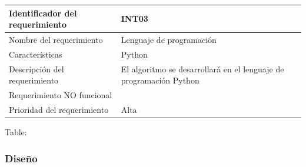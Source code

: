 \documentclass[]{article}
\begin{document}
\begin{longtable}[]{@{}ll@{}}
\toprule
\begin{minipage}[b]{0.39\columnwidth}\raggedright\strut
Identificador del requerimiento\strut
\end{minipage} & \begin{minipage}[b]{0.50\columnwidth}\raggedright\strut
INT03\strut
\end{minipage}\tabularnewline
\midrule
\endhead
\begin{minipage}[t]{0.39\columnwidth}\raggedright\strut
Nombre del requerimiento\strut
\end{minipage} & \begin{minipage}[t]{0.50\columnwidth}\raggedright\strut
Lenguaje de programación\strut
\end{minipage}\tabularnewline
\begin{minipage}[t]{0.39\columnwidth}\raggedright\strut
Características\strut
\end{minipage} & \begin{minipage}[t]{0.50\columnwidth}\raggedright\strut
Python\strut
\end{minipage}\tabularnewline
\begin{minipage}[t]{0.39\columnwidth}\raggedright\strut
Descripción del requerimiento\strut
\end{minipage} & \begin{minipage}[t]{0.50\columnwidth}\raggedright\strut
El algoritmo se desarrollará en el lenguaje de programación Python\strut
\end{minipage}\tabularnewline
\begin{minipage}[t]{0.39\columnwidth}\raggedright\strut
Requerimiento NO funcional\strut
\end{minipage} & \begin{minipage}[t]{0.50\columnwidth}\raggedright\strut
\strut
\end{minipage}\tabularnewline
\begin{minipage}[t]{0.39\columnwidth}\raggedright\strut
Prioridad del requerimiento\strut
\end{minipage} & \begin{minipage}[t]{0.50\columnwidth}\raggedright\strut
Alta\strut
\end{minipage}\tabularnewline
\bottomrule
\end{longtable}

Table:

\subsubsection{Diseño}\label{diseuxf1o}
\end{document}
